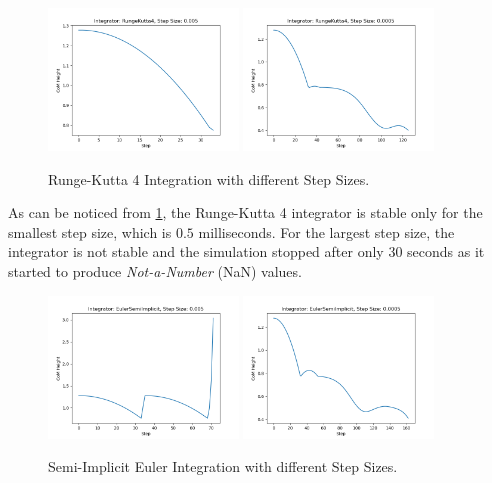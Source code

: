 \begin{figure}
    \centering
    \caption{Runge-Kutta 4 Integration with different Step Sizes.}
    \label{fig:rk4}
    \includegraphics[width=0.45\textwidth]{Images/rk4_5ms.png}
    \includegraphics[width=0.45\textwidth]{Images/rk4_05ms.png}
\end{figure}

As can be noticed from \cref{fig:rk4}, the Runge-Kutta 4 integrator is stable only for the smallest step size, which is $0.5$ milliseconds. For the largest step size, the integrator is not stable and the simulation stopped after only $30$ seconds as it started to produce \textit{Not-a-Number} (NaN) values.

\begin{figure}
    \centering
    \caption{Semi-Implicit Euler Integration with different Step Sizes.}
    \label{fig:sie}
    \includegraphics[width=0.45\textwidth]{Images/sie_5ms.png}
    \includegraphics[width=0.45\textwidth]{Images/sie_05ms.png}
\end{figure}

